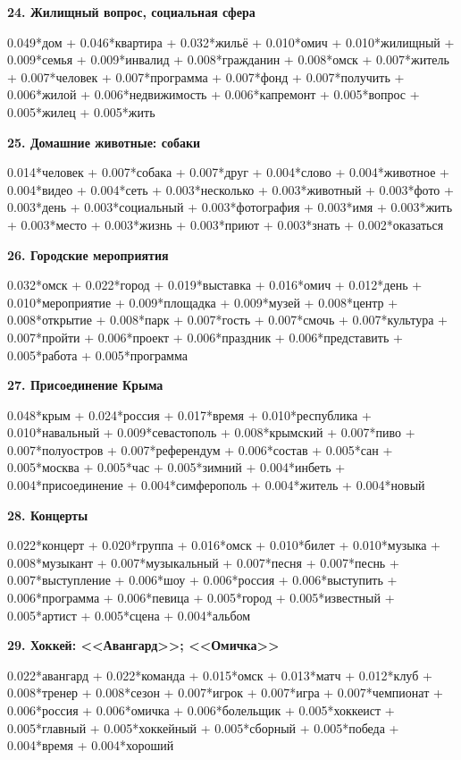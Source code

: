 \textbf{24. Жилищный вопрос, социальная сфера}

0.049*дом + 0.046*квартира + 0.032*жильё + 0.010*омич + 0.010*жилищный + 0.009*семья + 0.009*инвалид + 0.008*гражданин + 0.008*омск + 0.007*житель + 0.007*человек + 0.007*программа + 0.007*фонд + 0.007*получить + 0.006*жилой + 0.006*недвижимость + 0.006*капремонт + 0.005*вопрос + 0.005*жилец + 0.005*жить

\textbf{25. Домашние животные: собаки}

0.014*человек + 0.007*собака + 0.007*друг + 0.004*слово + 0.004*животное + 0.004*видео + 0.004*сеть + 0.003*несколько + 0.003*животный + 0.003*фото + 0.003*день + 0.003*социальный + 0.003*фотография + 0.003*имя + 0.003*жить + 0.003*место + 0.003*жизнь + 0.003*приют + 0.003*знать + 0.002*оказаться

\textbf{26. Городские мероприятия}

0.032*омск + 0.022*город + 0.019*выставка + 0.016*омич + 0.012*день + 0.010*мероприятие + 0.009*площадка + 0.009*музей + 0.008*центр + 0.008*открытие + 0.008*парк + 0.007*гость + 0.007*смочь + 0.007*культура + 0.007*пройти + 0.006*проект + 0.006*праздник + 0.006*представить + 0.005*работа + 0.005*программа

\textbf{27. Присоединение Крыма}

0.048*крым + 0.024*россия + 0.017*время + 0.010*республика + 0.010*навальный + 0.009*севастополь + 0.008*крымский + 0.007*пиво + 0.007*полуостров + 0.007*референдум + 0.006*состав + 0.005*сан + 0.005*москва + 0.005*час + 0.005*зимний + 0.004*инбеть + 0.004*присоединение + 0.004*симферополь + 0.004*житель + 0.004*новый

\textbf{28. Концерты}

0.022*концерт + 0.020*группа + 0.016*омск + 0.010*билет + 0.010*музыка + 0.008*музыкант + 0.007*музыкальный + 0.007*песня + 0.007*песнь + 0.007*выступление + 0.006*шоу + 0.006*россия + 0.006*выступить + 0.006*программа + 0.006*певица + 0.005*город + 0.005*известный + 0.005*артист + 0.005*сцена + 0.004*альбом

\textbf{29. Хоккей: <<Авангард>>; <<Омичка>>\footnotemark}

0.022*авангард + 0.022*команда + 0.015*омск + 0.013*матч + 0.012*клуб + 0.008*тренер + 0.008*сезон + 0.007*игрок + 0.007*игра + 0.007*чемпионат + 0.006*россия + 0.006*омичка + 0.006*болельщик + 0.005*хоккеист + 0.005*главный + 0.005*хоккейный + 0.005*сборный + 0.005*победа + 0.004*время + 0.004*хороший

